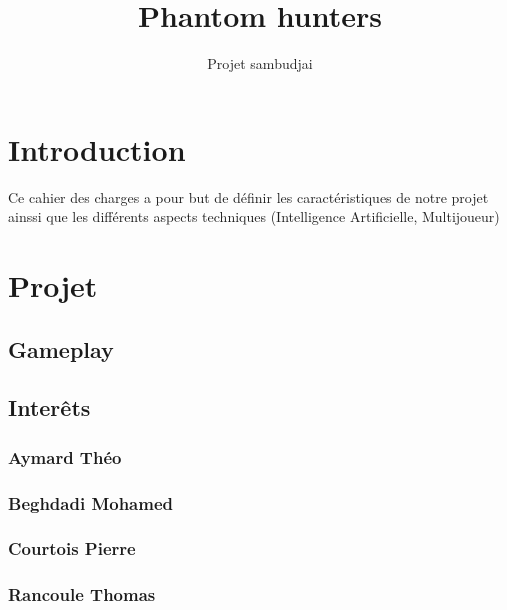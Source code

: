 \documentclass[10pt]{article} %
\title{\Huge Phantom hunters}
\author{Projet sambudjai}
\begin{document}
\maketitle

\newpage

\tableofcontents

\newpage

\section{Introduction}

Ce cahier des  charges a pour but de définir les caractéristiques de notre projet ainssi que les différents aspects techniques (Intelligence Artificielle, Multijoueur)

\section{Projet}



\subsection{Gameplay}



\subsection{Interêts}



\subsubsection{Aymard Théo}



\subsubsection{Beghdadi Mohamed}



\subsubsection{Courtois Pierre}



\subsubsection{Rancoule Thomas}
\end{document}
